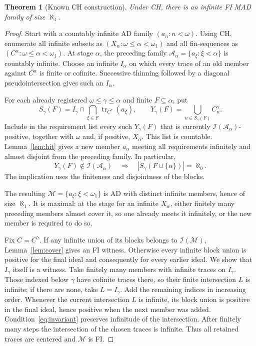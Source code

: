 \documentclass[11pt,letterpaper]{article}
\newtheorem{theorem}{Theorem}[section]
\theoremstyle{definition}
\theoremstyle{remark}
\newcommand{\A}{\mathcal{A}}
\newcommand{\M}{\mathcal{M}}
\newcommand{\tr}{\operatorname{tr}}
\newcommand{\Id}{\mathcal{I}}
\begin{document}
\begin{theorem}[Known CH construction]\label{thm:ch}
Under CH, there is an infinite FI MAD family of size $\aleph_1$.
\end{theorem}
\begin{proof}
Start with a countably infinite AD family $(a_n:n<\omega)$. Using CH,
enumerate all infinite subsets as $(X_\alpha:\omega\leq\alpha<\omega_1)$
and all fin-sequences as $(C^\alpha:\omega\leq\alpha<\omega_1)$.
At stage $\alpha$, the preceding family
$\A_\alpha=\{a_\xi:\xi<\alpha\}$ is countably infinite.
Choose an infinite $I_\alpha$ on which every trace of an old member against
$C^\alpha$ is finite or cofinite. Successive thinning followed by a
diagonal pseudointersection gives such an $I_\alpha$.

For each already registered $\omega\leq\gamma\leq\alpha$ and finite
$F\subseteq\alpha$, put
\[
 S_\gamma(F)=I_\gamma\cap\bigcap_{\xi\in F}\tr_{C^\gamma}(a_\xi),
 \qquad Y_\gamma(F)=\bigcup_{n\in S_\gamma(F)}C_n^\gamma.
\]
Include in the requirement list every such $Y_\gamma(F)$ that is currently
$\Id(\A_\alpha)$-positive, together with $\omega$ and, if positive, $X_\alpha$.
This list is countable. Lemma~\ref{lem:hit} gives a new member $a_\alpha$
meeting all requirements infinitely and almost disjoint from the preceding
family. In particular,
\begin{equation}\label{eq:invariant}
 Y_\gamma(F)\notin\Id(\A_\alpha)
 \quad\Longrightarrow\quad |S_\gamma(F\cup\{\alpha\})|=\aleph_0.
\end{equation}
The implication uses the finiteness and disjointness of the blocks.

The resulting $\M=\{a_\xi:\xi<\omega_1\}$ is AD with distinct infinite
members, hence of size $\aleph_1$. It is maximal: at the stage for an
infinite $X_\alpha$, either finitely many preceding members almost cover it,
so one already meets it infinitely, or the new member is required to do so.

Fix $C=C^\gamma$. If any infinite union of its blocks belongs to $\Id(\M)$,
Lemma~\ref{lem:cover} gives an FI witness. Otherwise every infinite block
union is positive for the final ideal and consequently for every earlier
ideal. We show that $I_\gamma$ itself is a witness.
Take finitely many members with infinite traces on $I_\gamma$.
Those indexed below $\gamma$ have cofinite traces there, so their finite
intersection $L$ is infinite; if there are none, take $L=I_\gamma$.
Add the remaining indices in increasing order. Whenever the current
intersection $L$ is infinite, its block union is positive in the final
ideal, hence positive when the next member was added.
Condition~\eqref{eq:invariant} preserves infinitude of the intersection.
After finitely many steps the intersection of the chosen traces is infinite.
Thus all retained traces are centered and $\M$ is FI.
\end{proof}
\end{document}
